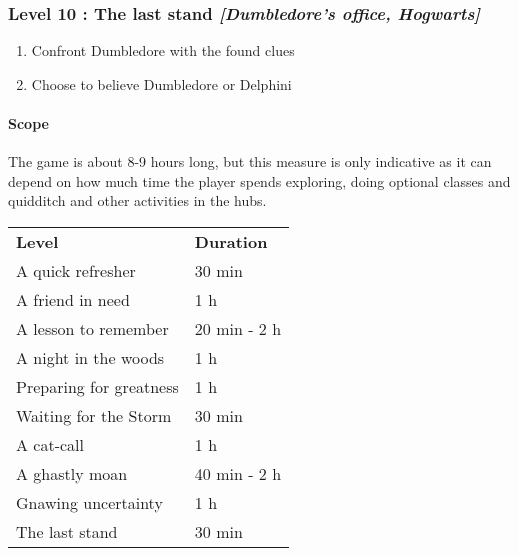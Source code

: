 \subsubsection{Level 10 : The last stand \textit{[Dumbledore's office, Hogwarts]}}
\begin{enumerate}[1)]
	\item Confront Dumbledore with the found clues
	\item Choose to believe Dumbledore or Delphini
\end{enumerate}

\clearpage

\paragraph{Scope}

The game is about 8-9 hours long, but this measure is only indicative as it can depend on how much time the player spends exploring, doing optional classes and quidditch and other activities in the hubs.

\begin{table}[htb]
	\begin{tabular}{ll}
		\textbf{Level} & \textbf{Duration} \\
		A quick refresher & 30 min \\
		A friend in need & 1 h \\
		A lesson to remember & 20 min - 2 h \\
		A night in the woods & 1 h \\
		Preparing for greatness & 1 h \\
		Waiting for the Storm & 30 min \\
		A cat-call & 1 h \\
		A ghastly moan & 40 min - 2 h \\
		Gnawing uncertainty & 1 h \\
		 The last stand & 30 min 
	\end{tabular}
\end{table}

\pagebreak